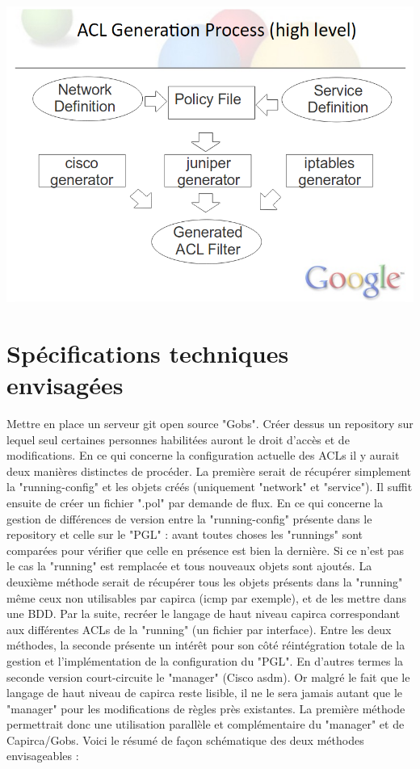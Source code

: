 \documentclass{article}
\begin{document}
\includegraphics[scale=0.4]{capirca.png}

\maketitle
\section{Spécifications techniques envisagées}

Mettre en place un serveur git open source "Gobs". Créer dessus un repository sur lequel seul certaines personnes habilitées auront le droit d'accès et de modifications. En ce qui concerne la configuration actuelle des ACLs il y aurait deux manières distinctes de procéder. La première serait de récupérer simplement la "running-config" et les objets créés (uniquement "network" et "service").
Il suffit ensuite de créer un fichier ".pol" par demande de flux. En ce qui concerne la gestion de différences de version entre la "running-config" présente dans le repository et celle sur le "PGL" : avant toutes choses les "runnings" sont comparées pour vérifier que celle en présence est bien la dernière. Si ce n'est pas le cas la "running" est remplacée et tous nouveaux objets sont ajoutés.
La deuxième méthode serait de récupérer tous les objets présents dans la "running" même ceux non utilisables par capirca (icmp par exemple), et de les mettre dans une BDD. Par la suite, recréer le langage de haut niveau capirca correspondant aux différentes ACLs de la "running" (un fichier par interface).
Entre les deux méthodes, la seconde présente un intérêt pour son côté réintégration totale de la gestion et l'implémentation de la configuration du "PGL". En d'autres termes la seconde version court-circuite le "manager" (Cisco asdm). Or malgré le fait que le langage de haut niveau de capirca reste lisible, il ne le sera jamais autant que le "manager" pour les modifications de règles près existantes.
La première méthode permettrait donc une utilisation parallèle et complémentaire du "manager" et de Capirca/Gobs. Voici le résumé de façon schématique des deux méthodes envisageables :
\end{document}

